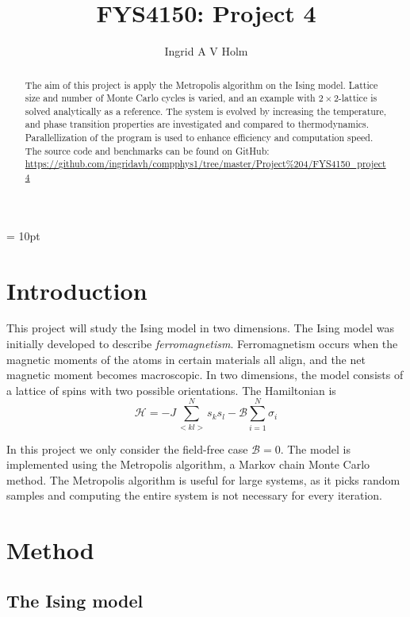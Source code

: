 \documentclass[11pt]{article}
\begin{document}
\title{FYS4150: Project 4}
\author{Ingrid A V Holm}
\maketitle


\marginparwidth = 10pt

\begin{abstract}
The aim of this project is apply the Metropolis algorithm on the Ising model. Lattice size and number of Monte Carlo cycles is varied, and an example with $2 \times 2$-lattice is solved analytically as a reference. The system is evolved by increasing the temperature, and phase transition properties are investigated and compared to thermodynamics. Parallellization of the program is used to enhance efficiency and computation speed. The source code and benchmarks can be found on GitHub: \url{https://github.com/ingridavh/compphys1/tree/master/Project%204/FYS4150_project4}
\end{abstract}


\section{Introduction}

\begin{flushleft}
This project will study the Ising model in two dimensions. The Ising model was initially developed to describe \textit{ferromagnetism}. Ferromagnetism occurs when the magnetic moments of the atoms in certain materials all align, and the net magnetic moment becomes macroscopic. In two dimensions, the model consists of a lattice of spins with two possible orientations. The Hamiltonian is 
\begin{equation*}
\mathcal{H} = -J \sum^N_{<kl>} s_k s_l - \mathcal{B} \sum_{i=1}^N \sigma_i
\end{equation*}

In this project we only consider the field-free case $\mathcal{B}=0$. The model is implemented using the Metropolis algorithm, a Markov chain Monte Carlo method. The Metropolis algorithm is useful for large systems, as it picks random samples and computing the entire system is not necessary for every iteration.
\end{flushleft}


\section{Method}

\subsection{The Ising model}
\end{document}

